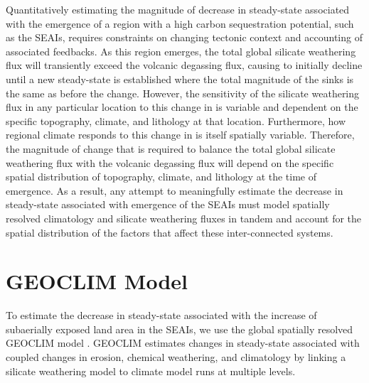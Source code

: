Quantitatively estimating the magnitude of decrease in steady-state \pCOtwo associated with the emergence of a region with a high carbon sequestration potential, such as the SEAIs, requires constraints on changing tectonic context and accounting of associated feedbacks. As this region emerges, the total global silicate weathering flux will transiently exceed the volcanic degassing flux, causing \pCOtwo to initially decline until a new steady-state is established where the total magnitude of the \COtwo sinks is the same as before the change. However, the sensitivity of the silicate weathering flux in any particular location to this change in \pCOtwo is variable and dependent on the specific topography, climate, and lithology at that location. Furthermore, how regional climate responds to this change in \pCOtwo is itself spatially variable. Therefore, the magnitude of \pCOtwo change that is required to balance the total global silicate weathering flux with the volcanic degassing flux will depend on the specific spatial distribution of topography, climate, and lithology at the time of emergence. As a result, any attempt to meaningfully estimate the decrease in steady-state \pCOtwo associated with emergence of the SEAIs must model spatially resolved climatology and silicate weathering fluxes in tandem and account for the spatial distribution of the factors that affect these inter-connected systems.

\section{GEOCLIM Model}

To estimate the decrease in steady-state \pCOtwo associated with the increase of subaerially exposed land area in the SEAIs, we use the global spatially resolved GEOCLIM model \citep{Godderis2017c}. GEOCLIM estimates changes in steady-state \pCOtwo associated with coupled changes in erosion, chemical weathering, and climatology by linking a silicate weathering model to climate model runs at multiple \pCOtwo levels.

